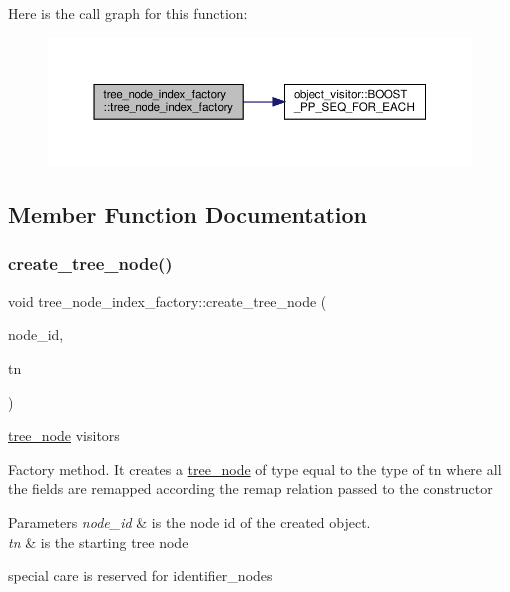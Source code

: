 Here is the call graph for this function\+:
\nopagebreak
\begin{figure}[H]
\begin{center}
\leavevmode
\includegraphics[width=350pt]{d5/d72/structtree__node__index__factory_ab7ae7b8d50387e481d2cc5f9f9004323_cgraph}
\end{center}
\end{figure}


\subsection{Member Function Documentation}
\mbox{\label{structtree__node__index__factory_a786ee30f904dd9e3fc7428195b6bec81}} 
\subsubsection{\texorpdfstring{create\+\_\+tree\+\_\+node()}{create\_tree\_node()}}
{\footnotesize\ttfamily void tree\+\_\+node\+\_\+index\+\_\+factory\+::create\+\_\+tree\+\_\+node (\begin{DoxyParamCaption}\item[{const unsigned int}]{node\+\_\+id,  }\item[{const \hyperlink{tree__node_8hpp_a6ee377554d1c4871ad66a337eaa67fd5}{tree\+\_\+node\+Ref} \&}]{tn }\end{DoxyParamCaption})}



\hyperlink{classtree__node}{tree\+\_\+node} visitors 

Factory method. It creates a \hyperlink{classtree__node}{tree\+\_\+node} of type equal to the type of tn where all the fields are remapped according the remap relation passed to the constructor 
\begin{DoxyParams}{Parameters}
{\em node\+\_\+id} & is the node id of the created object. \\
\hline
{\em tn} & is the starting tree node \\
\hline
\end{DoxyParams}
special care is reserved for identifier\+\_\+nodes 


